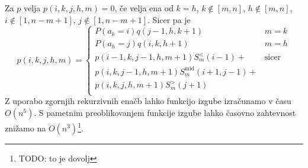 \documentclass[mat2, tisk]{fmfdelo}
\newcommand{\TODO}[1]{{\color{blue} TODO: #1}}
\begin{document}
            Za $p$ velja $p(i, k, j, h, m) = 0$, če velja ena od $k=h$,
            $k \notin [m, n]$, $h \notin [m, n]$, $i \notin [1,
            n-m+1]$, $j \notin [1, n-m+1]$.
            Sicer pa je
            $$
            p(i, k, j, h, m) =
            \begin{cases}
              P(a_k = i) q(j-1, h, k+1) & m = k \\
              P(a_h = j) q(i, k, h+1) & m = h \\
              p(i-1, k, j-1, h, m+1) S_m^<(i-1) +
              &  \text{sicer} \\
              p(i, k, j-1, h, m+1) S_m^{\text{mid}}(i+1, j-1) +
              &\\
              p(i, k, j, h, m+1) S_m^>(j+1)
              & \\
            \end{cases}
            $$
            Z uporabo zgornjih rekurzivnih
            enačb lahko funkcijo izgube izračunamo v času
            $O(n^5)$. S pametnim preoblikovanjem funkcije izgube lahko
            časovno zahtevnost znižamo na $O(n^3)$\footnote{\TODO{to
            je dovolj }}.
\end{document}
